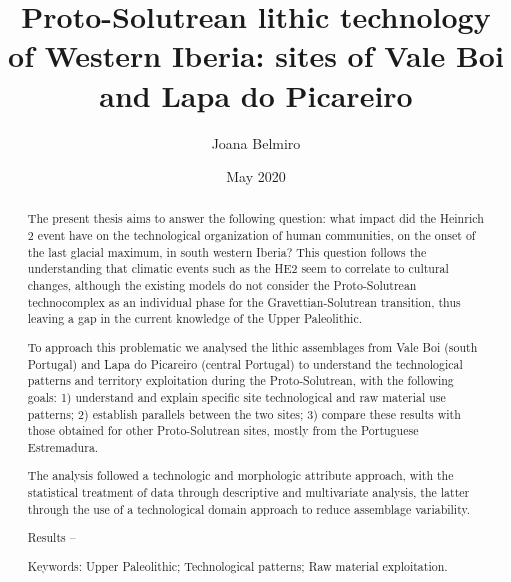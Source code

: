 \documentclass[12pt,twoside]{reedthesis}
\title{Proto-Solutrean lithic technology of Western Iberia: sites of Vale Boi and Lapa do Picareiro}
\author{Joana Belmiro}
\date{May 2020}
\begin{document}
  \maketitle

\frontmatter %


  \begin{abstract}
    The present thesis aims to answer the following question: what impact did the Heinrich 2 event have on the technological organization of human communities, on the onset of the last glacial maximum, in south western Iberia? This question follows the understanding that climatic events such as the HE2 seem to correlate to cultural changes, although the existing models do not consider the Proto-Solutrean technocomplex as an individual phase for the Gravettian-Solutrean transition, thus leaving a gap in the current knowledge of the Upper Paleolithic.
    
    \par
    
    To approach this problematic we analysed the lithic assemblages from Vale Boi (south Portugal) and Lapa do Picareiro (central Portugal) to understand the technological patterns and territory exploitation during the Proto-Solutrean, with the following goals: 1) understand and explain specific site technological and raw material use patterns; 2) establish parallels between the two sites; 3) compare these results with those obtained for other Proto-Solutrean sites, mostly from the Portuguese Estremadura.
    
    The analysis followed a technologic and morphologic attribute approach, with the statistical treatment of data through descriptive and multivariate analysis, the latter through the use of a technological domain approach to reduce assemblage variability.
    
    Results --
    
    Keywords: Upper Paleolithic; Technological patterns; Raw material exploitation.
  \end{abstract}
\end{document}
